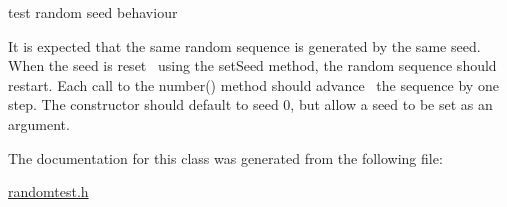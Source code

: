 test random seed behaviour 

It is expected that the same random sequence is generated by the same seed. When the seed is reset~\newline
using the set\+Seed method, the random sequence should restart. Each call to the number() method should advance~\newline
the sequence by one step. The constructor should default to seed 0, but allow a seed to be set as an argument. 

The documentation for this class was generated from the following file\+:\begin{DoxyCompactItemize}
\item 
\mbox{\hyperlink{randomtest_8h}{randomtest.\+h}}\end{DoxyCompactItemize}
